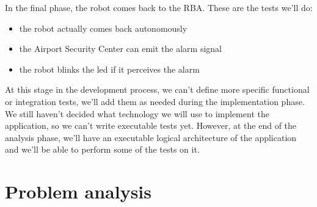 \documentclass{llncs}
\newcommand{\labelsec}[1]{\label{sec:#1}}
\begin{document}
In the final phase, the robot comes back to the RBA. These are the tests we'll do:
\begin{itemize}
\item the robot actually comes back autonomously
\item the Airport Security Center can emit the alarm signal
\item the robot blinks the led if it perceives the alarm
\end{itemize}
At this stage in the development process, we can't define more specific functional or integration tests, we'll add them as needed during the implementation phase.
We still haven't decided what technology we will use to implement the application, so we can't write executable tests yet. However, at the end of the analysis phase, we'll have an executable logical architecture of the application and we'll be able to perform some of the tests on it.
\newpage
\section{Problem analysis}
\labelsec{ProblemAnalysis}
\end{document}
